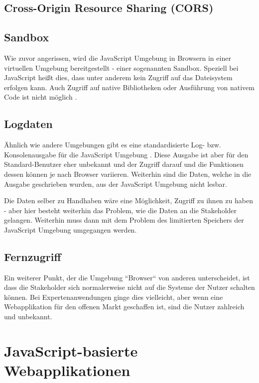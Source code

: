 \subsection{Cross-Origin Resource Sharing (CORS)}

\subsection{Sandbox}

Wie zuvor angerissen, wird die JavaScript Umgebung in Browsern in einer virtuellen Umgebung bereitgestellt - einer sogenannten Sandbox. Speziell bei JavaScript heißt dies, dass unter anderem kein Zugriff auf das Dateisystem erfolgen kann. Auch Zugriff auf native Bibliotheken oder Ausführung von nativem Code ist nicht möglich \cite{TheSpyInTheSandbox}.

\subsection{Logdaten}

Ähnlich wie andere Umgebungen gibt es eine standardisierte Log- bzw. Konsolenausgabe für die JavaScript Umgebung \cite{MDNConsole}. Diese Ausgabe ist aber für den Standard-Benutzer eher unbekannt und der Zugriff darauf und die Funktionen dessen können je nach Browser variieren. Weiterhin sind die Daten, welche in die Ausgabe geschrieben wurden, aus der JavaScript Umgebung nicht lesbar.

Die Daten selber zu Handhaben wäre eine Möglichkeit, Zugriff zu ihnen zu haben - aber hier besteht weiterhin das Problem, wie die Daten an die Stakeholder gelangen. Weiterhin muss dann mit dem Problem des limitierten Speichers der JavaScript Umgebung umgegangen werden.

\subsection{Fernzugriff}

Ein weiterer Punkt, der die Umgebung ``Browser`` von anderen unterscheidet, ist dass die Stakeholder sich normalerweise nicht auf die Systeme der Nutzer schalten können. Bei Expertenanwendungen ginge dies vielleicht, aber wenn eine Webapplikation für den offenen Markt geschaffen ist, sind die Nutzer zahlreich und unbekannt.

\section{JavaScript-basierte Webapplikationen}

	
